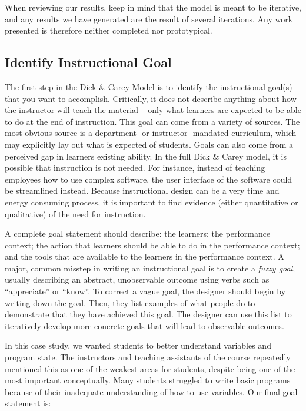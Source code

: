 \documentclass{acm_proc_article-sp}
\begin{document}
When reviewing our results, keep in mind that the model is meant to be iterative, and any results we have generated are the result of several iterations. 
Any work presented is therefore neither completed nor prototypical.

\subsection{Identify Instructional Goal}

The first step in the Dick \& Carey Model is to identify the instructional goal(s) that you want to accomplish.
Critically, it does not describe anything about how the instructor will teach the material -- only what learners are expected to be able to do at the end of instruction.
This goal can come from a variety of sources.
The most obvious source is a department- or instructor- mandated curriculum, which may explicitly lay out what is expected of students.
Goals can also come from a perceived gap in learners existing ability.
In the full Dick \& Carey model, it is possible that instruction is not needed.
For instance, instead of teaching employees how to use complex software, the user interface of the software could be streamlined instead.
Because instructional design can be a very time and energy consuming process, it is important to find evidence (either quantitative or qualitative) of the need for instruction.

A complete goal statement should describe: the learners; the performance context; the action that learners should be able to do in the performance context; and the tools that are available to the learners in the performance context.
A major, common misstep in writing an instructional goal is to create a \textit{fuzzy goal}, usually describing an abstract, unobservable outcome using verbs such as ``appreciate'' or ``know''.
To correct a vague goal, the designer should begin by writing down the goal.
Then, they list examples of what people do to demonstrate that they have achieved this goal.
The designer can use this list to iteratively develop more concrete goals that will lead to observable outcomes.

In this case study, we wanted students to better understand variables and program state.
The instructors and teaching assistants of the course repeatedly mentioned this as one of the weakest areas for students, despite being one of the most important conceptually.
Many students struggled to write basic programs because of their inadequate understanding of how to use variables.
Our final goal statement is:
\end{document}
